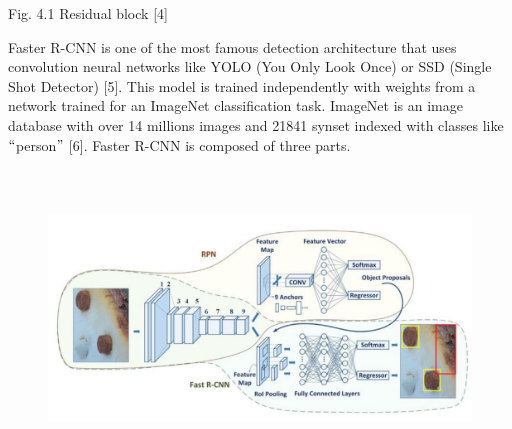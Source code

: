 \documentclass[12pt]{report}
\renewcommand{\_}{\kern-1.5pt\textunderscore\kern-1.5pt}
\begin{document}
\begin{adjustwidth}{1.5in}{0.0in}
Fig. 4.1 Residual block [4]\par

\end{adjustwidth}


\vspace{\baselineskip}

\vspace{\baselineskip}

\vspace{\baselineskip}

\vspace{\baselineskip}
\begin{justify}
Faster R-CNN is one of the most famous detection architecture that uses convolution neural networks like YOLO (You Only Look Once) or SSD (Single Shot Detector) [5]. This model is trained independently with weights from a network trained for an ImageNet classification task. ImageNet is an image database with over 14 millions images and 21841 synset indexed with classes like $``$person$"$  [6]. Faster R-CNN is composed of three parts.
\end{justify}\par




\begin{figure}[H]
	\begin{Center}
		\includegraphics[width=6.27in,height=3.08in]{./media/image6.png}
	\end{Center}
\end{figure}


\end{document}
